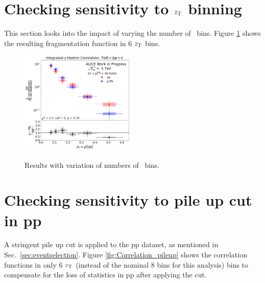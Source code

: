 
\section{Checking sensitivity to $z_{\mathrm{T}}$ binning}
This section looks into the impact of varying the number of \zt~bins. Figure \ref{fig:FF_zT_Rebin} shows the resulting fragmentation function in 6 $z_{\mathrm{T}}$ bins. 


\begin{figure}[hbtp]
\centering
\includegraphics[width=0.49\textwidth]{G-H_New/zT_Rebin_6_006zT06zTITSSub/Final_FFunction_and_Ratio.pdf}
\label{fig:FF_zT_Rebin}
\caption{Results with variation of numbers of \zt~bins. }
\end{figure}



\section{Checking sensitivity to pile up cut in pp}
A stringent pile up cut is applied to the pp dataset, as mentioned in Sec.~\ref{sec:eventselection}. Figure \ref{fig:Correlation_pileup} shows the correlation functions in only 6 $z_{\mathrm{T}}$ (instead of the nominal 8 bins for this analysis) bins to compensate for the loss of statistics in pp after applying the cut.

